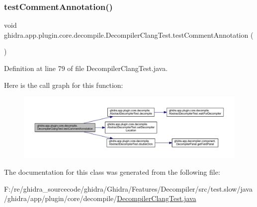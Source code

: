 \subsubsection{\texorpdfstring{testCommentAnnotation()}{testCommentAnnotation()}}
{\footnotesize\ttfamily void ghidra.\+app.\+plugin.\+core.\+decompile.\+Decompiler\+Clang\+Test.\+test\+Comment\+Annotation (\begin{DoxyParamCaption}{ }\end{DoxyParamCaption})\hspace{0.3cm}{\ttfamily [inline]}}



Definition at line 79 of file Decompiler\+Clang\+Test.\+java.

Here is the call graph for this function\+:
\nopagebreak
\begin{figure}[H]
\begin{center}
\leavevmode
\includegraphics[width=350pt]{classghidra_1_1app_1_1plugin_1_1core_1_1decompile_1_1_decompiler_clang_test_aae9092113dcff1e5871fa23682cbc1e4_cgraph}
\end{center}
\end{figure}


The documentation for this class was generated from the following file\+:\begin{DoxyCompactItemize}
\item 
F\+:/re/ghidra\+\_\+sourcecode/ghidra/\+Ghidra/\+Features/\+Decompiler/src/test.\+slow/java/ghidra/app/plugin/core/decompile/\mbox{\hyperlink{_decompiler_clang_test_8java}{Decompiler\+Clang\+Test.\+java}}\end{DoxyCompactItemize}
